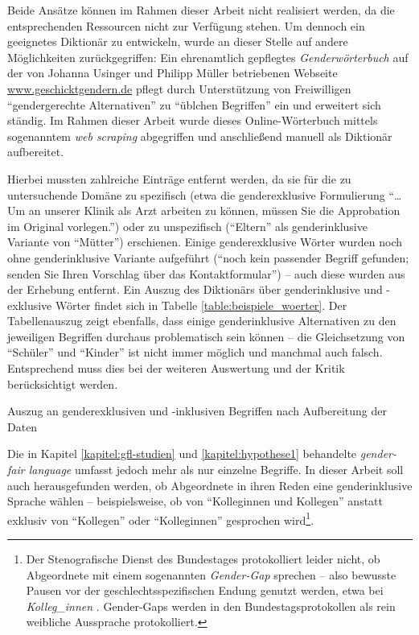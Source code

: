 \documentclass[12pt, 
    twoside=false, 
    bibliography=totoc, 
    numbers=endperiod, 
    headings=normal, 
    toc=chapterentrydotfill
    ]{scrbook}
\begin{document}
Beide Ansätze können im Rahmen dieser Arbeit nicht realisiert werden, da die entsprechenden Ressourcen nicht zur Verfügung stehen. Um dennoch ein geeignetes Diktionär zu entwickeln, wurde an dieser Stelle auf andere Möglichkeiten zurückgegriffen:
Ein ehrenamtlich gepflegtes \emph{Genderwörterbuch} auf der von Johanna Usinger und Philipp Müller betriebenen Webseite \url{www.geschicktgendern.de} pflegt durch Unterstützung von Freiwilligen \enquote{gendergerechte Alternativen} zu \enquote{üblchen Begriffen} ein und erweitert sich ständig. Im Rahmen dieser Arbeit wurde dieses Online-Wörterbuch mittels sogenanntem \emph{web scraping} \parencite{wickham_2016} abgegriffen und anschließend manuell als Diktionär aufbereitet. 

Hierbei mussten zahlreiche Einträge entfernt werden, da sie für die zu untersuchende Domäne zu spezifisch (etwa die genderexklusive Formulierung \enquote{… Um an unserer Klinik als Arzt arbeiten zu können, müssen Sie die Approbation im Original vorlegen.}) oder zu unspezifisch (\enquote{Eltern} als genderinklusive Variante von \enquote{Mütter}) erschienen. Einige genderexklusive Wörter wurden noch ohne genderinklusive Variante aufgeführt (\enquote{noch kein passender Begriff gefunden; senden Sie Ihren Vorschlag über das Kontaktformular}) -- auch diese wurden aus der Erhebung entfernt. Ein Auszug des Diktionärs über genderinklusive und -exklusive Wörter findet sich in Tabelle \ref{table:beispiele_woerter}. Der Tabellenauszug zeigt ebenfalls, dass einige genderinklusive Alternativen zu den jeweiligen Begriffen durchaus problematisch sein können -- die Gleichsetzung von \enquote{Schüler} und \enquote{Kinder} ist nicht immer möglich und manchmal auch falsch. Entsprechend muss dies bei der weiteren Auswertung und der Kritik berücksichtigt werden.


\begin{table}[htb]
    \centering
    \caption[Auszug an genderexklusiven und -inklusiven Begriffen nach Aufbereitung der Daten]{Auszug an genderexklusiven und -inklusiven Begriffen nach Aufbereitung der Daten}
    
    \label{table:beispiele_woerter}
\end{table}

Die in Kapitel \ref{kapitel:gfl-studien} und \ref{kapitel:hypothese1} behandelte \emph{gender-fair language} umfasst jedoch mehr als nur einzelne Begriffe. In dieser Arbeit soll auch herausgefunden werden, ob Abgeordnete in ihren Reden eine genderinklusive Sprache wählen -- beispielsweise, ob von \enquote{Kolleginnen und Kollegen} anstatt exklusiv von \enquote{Kollegen} oder \enquote{Kolleginnen} gesprochen wird\footnote{Der Stenografische Dienst des Bundestages protokolliert leider nicht, ob Abgeordnete mit einem sogenannten \emph{Gender-Gap} sprechen -- also bewusste Pausen vor der geschlechtsspezifischen Endung genutzt werden, etwa bei \emph{Kolleg\_innen} \parencite[vgl.][]{reisigl_2017}. Gender-Gaps werden in den Bundestagsprotokollen als rein weibliche Aussprache protokolliert.}. 
\end{document}
